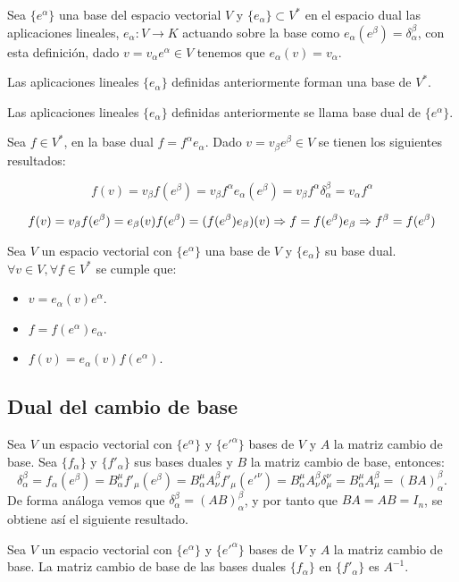 Sea $\{e^\alpha\}$ una base del espacio vectorial $V$
y $\{e_\alpha\}\subset V^*$ en el espacio dual las aplicaciones lineales, $e_\alpha: V
\longrightarrow
K$
actuando
sobre la
base
como $e_\alpha(e^\beta)=\delta_\alpha^\beta$, con esta definición, dado $v=v_\alpha e^\alpha\in V$ tenemos
que $e_\alpha(v)=v_\alpha$.

\begin{exercise}
  Las aplicaciones lineales $\{e_\alpha\}$ definidas anteriormente forman una base de $V^*$.
\end{exercise}

\begin{definition}
  Las aplicaciones lineales $\{e_\alpha\}$ definidas anteriormente se llama base dual de $\{e^\alpha\}$.
\end{definition}

Sea $f\in V^*$, en la base dual $f=f^\alpha e_\alpha$.
Dado $v=v_\beta e^\beta\in V$ se tienen los siguientes resultados:

\begin{equation*}
  f(v)=v_\beta f(e^\beta)=v_\beta f^\alpha e_\alpha(e^\beta)=
  v_\beta f^\alpha \delta_\alpha^\beta=v_\alpha f^\alpha
\end{equation*}

\begin{equation*}
  f(v)=v_\beta f(e^\beta)=e_\beta(v)f(e^\beta)=(f(e^\beta) e_\beta)(v)\Rightarrow f=f(e^\beta) e_\beta\Rightarrow f^\beta=f(e^\beta)
\end{equation*}

\begin{proposition}
  \label{res:coordenadas_duales}
  Sea $V$ un espacio vectorial con $\{e^\alpha\}$ una base de $V$ y $\{e_\alpha\}$ su base dual.
  $\forall v\in V, \forall f\in V^*$ se cumple que:
  \begin{itemize}
    \item $v=e_\alpha(v)e^\alpha$.
    \item $f=f(e^\alpha)e_\alpha$.
    \item $f(v)=e_\alpha(v)f(e^\alpha)$.
  \end{itemize}
\end{proposition}


\subsection{Dual del cambio de base}\label{subsec:dual-del-cambio-de-base}
Sea $V$ un espacio vectorial con $\{e^\alpha\}$ y $\{e'^\alpha\}$ bases de $V$ y $A$ la matriz cambio de base.
Sea $\{f_\alpha\}$ y $\{f'_\alpha\}$ sus bases duales y $B$ la matriz cambio de base, entonces:
\[
  \delta_\alpha^\beta=f_\alpha(e^\beta)=B_\alpha^\mu f'_\mu(e^\beta)=B_\alpha^\mu A^\beta_\nu f'_\mu(e'^\nu)=B_\alpha^\mu A^\beta_\nu\delta^\nu_\mu=B_\alpha^\mu A^\beta_\mu=(BA)^\beta_\alpha.
\]
De forma análoga vemos que $\delta^\beta_\alpha=(AB)^\beta_\alpha$, y por tanto que $BA=AB=I_n$, se obtiene así el
siguiente resultado.

\begin{proposition}
  \label{res:dual_cambio_base}
  Sea $V$ un espacio vectorial con $\{e^\alpha\}$ y $\{e'^\alpha\}$ bases de $V$ y $A$ la matriz cambio de base.
  La matriz cambio de base de las bases duales $\{f_\alpha\}$ en $\{f'_\alpha\}$ es $A^{-1}$.

\end{proposition}
